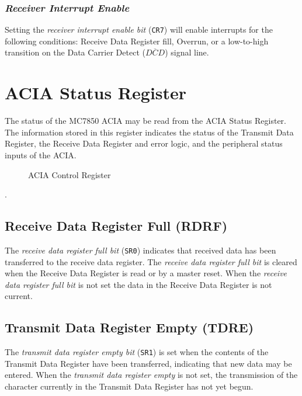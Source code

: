 \documentclass[a4paper,11pt,twoside,openright]{report}
\renewcommand{\arraystretch}{1.1}
\newcommand{\code}{\texttt}
\begin{document}
\subsubsection*{\textit{Receiver Interrupt Enable}}
Setting the \textit{receiver interrupt enable bit} (\code{CR7}) will enable interrupts for the following conditions: Receive Data Register fill, Overrun, or a low-to-high transition on the Data Carrier Detect ($\overline{DCD}$) signal line.

\section*{ACIA Status Register}

The status of the MC7850 ACIA may be read from the ACIA Status Register. The information stored in this register indicates the status of the Transmit Data Register, the Receive Data Register and error logic, and the peripheral status inputs of the ACIA.

\begin{figure}[H]
\renewcommand{\arraystretch}{1.2}
\centering	
{}
\caption{ACIA Control Register}
\end{figure}.

\subsection*{Receive Data Register Full (RDRF)}
The \textit{receive data register full bit} (\code{SR0}) indicates that received data has been transferred to the receive data register. The \textit{receive data register full bit} is cleared when the Receive Data Register is read or by a master reset. When the \textit{receive data register full bit} is not set the data in the Receive Data Register is not current.

\subsection*{Transmit Data Register Empty (TDRE)}
The \textit{transmit data register empty bit} (\code{SR1}) is set when the contents of the Transmit Data Register have been transferred, indicating that new data may be entered. When the \textit{transmit data register empty} is not set, the transmission of the character currently in the Transmit Data Register has not yet begun.
\end{document}
